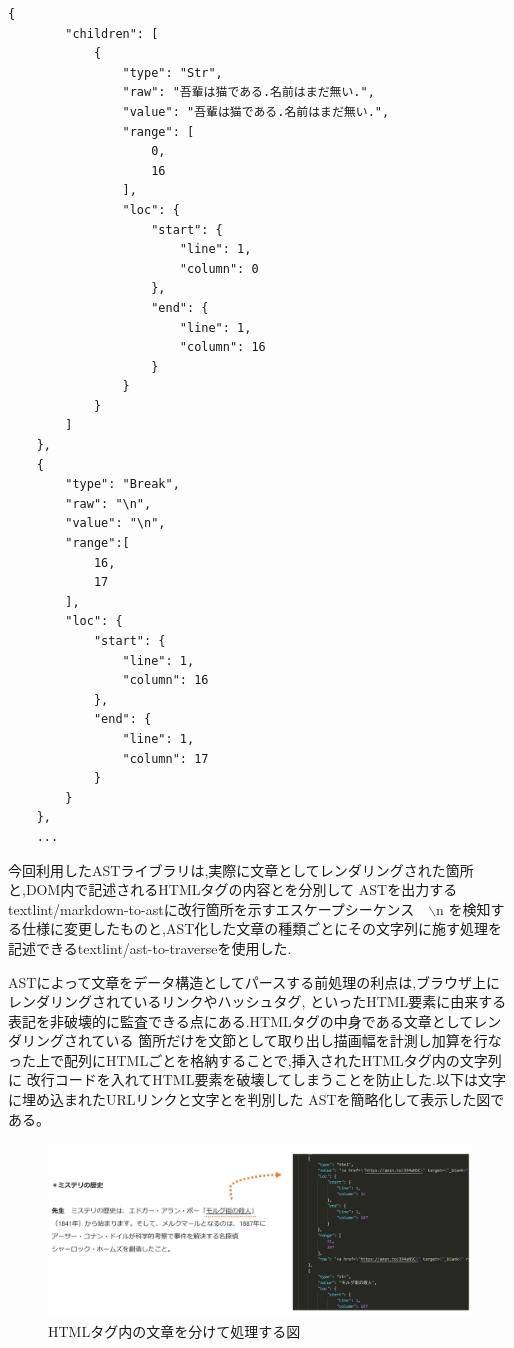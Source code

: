 \begin{lstlisting}[caption=textToAST.json]
    {
        "children": [
            {
                "type": "Str",
                "raw": "吾輩は猫である.名前はまだ無い.",
                "value": "吾輩は猫である.名前はまだ無い.",
                "range": [
                    0,
                    16
                ],
                "loc": {
                    "start": {
                        "line": 1,
                        "column": 0
                    },
                    "end": {
                        "line": 1,
                        "column": 16
                    }
                }
            }
        ]
    },
    {
        "type": "Break",
        "raw": "\n",
        "value": "\n",
        "range":[
            16,
            17
        ],
        "loc": {
            "start": {
                "line": 1,
                "column": 16
            },
            "end": {
                "line": 1,
                "column": 17
            }
        }
    },
    ...
\end{lstlisting}

今回利用したASTライブラリは,実際に文章としてレンダリングされた箇所と,DOM内で記述されるHTMLタグの内容とを分別して
ASTを出力するtextlint/markdown-to-astに改行箇所を示すエスケープシーケンス　$\backslash$n
を検知する仕様に変更したものと\footnotemark[5],AST化した文章の種類ごとにその文字列に施す処理を記述できるtextlint/ast-to-traverseを使用した.\footnotemark[6]


ASTによって文章をデータ構造としてパースする前処理の利点は,ブラウザ上にレンダリングされているリンクやハッシュタグ,
といったHTML要素に由来する表記を非破壊的に監査できる点にある.HTMLタグの中身である文章としてレンダリングされている
箇所だけを文節として取り出し描画幅を計測し加算を行なった上で配列にHTMLごとを格納することで,挿入されたHTMLタグ内の文字列に
改行コードを入れてHTML要素を破壊してしまうことを防止した.以下は文字に埋め込まれたURLリンクと文字とを判別した
ASTを簡略化して表示した図である。

\begin{figure}[H]
    \centering
    \label{fig:image16}
    \includegraphics[width=0.7\columnwidth]{image/03/img7.png}
	\caption[HTMLタグ内の文章を分けて処理する図]{HTMLタグ内の文章を分けて処理する図} \footnotemark[7]
\end{figure}

